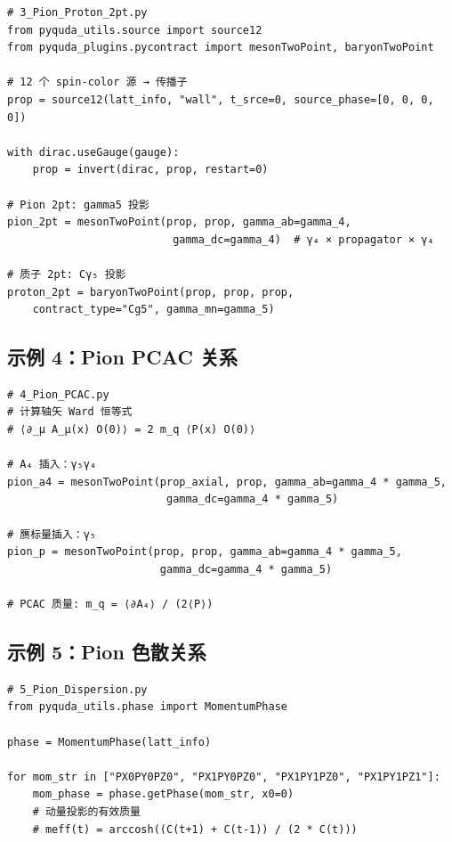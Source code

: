 \documentclass[12pt,a4paper]{ctexart}
\begin{document}
\begin{lstlisting}[style=pycode]
# 3_Pion_Proton_2pt.py
from pyquda_utils.source import source12
from pyquda_plugins.pycontract import mesonTwoPoint, baryonTwoPoint

# 12 个 spin-color 源 → 传播子
prop = source12(latt_info, "wall", t_srce=0, source_phase=[0, 0, 0, 0])

with dirac.useGauge(gauge):
    prop = invert(dirac, prop, restart=0)

# Pion 2pt: gamma5 投影
pion_2pt = mesonTwoPoint(prop, prop, gamma_ab=gamma_4,
                          gamma_dc=gamma_4)  # γ₄ × propagator × γ₄

# 质子 2pt: Cγ₅ 投影
proton_2pt = baryonTwoPoint(prop, prop, prop,
    contract_type="Cg5", gamma_mn=gamma_5)
\end{lstlisting}

\subsection{示例 4：Pion PCAC 关系}

\begin{lstlisting}[style=pycode]
# 4_Pion_PCAC.py
# 计算轴矢 Ward 恒等式
# ⟨∂_μ A_μ(x) O(0)⟩ = 2 m_q ⟨P(x) O(0)⟩

# A₄ 插入：γ₅γ₄
pion_a4 = mesonTwoPoint(prop_axial, prop, gamma_ab=gamma_4 * gamma_5,
                         gamma_dc=gamma_4 * gamma_5)

# 赝标量插入：γ₅
pion_p = mesonTwoPoint(prop, prop, gamma_ab=gamma_4 * gamma_5,
                        gamma_dc=gamma_4 * gamma_5)

# PCAC 质量: m_q = ⟨∂A₄⟩ / (2⟨P⟩)
\end{lstlisting}

\subsection{示例 5：Pion 色散关系}

\begin{lstlisting}[style=pycode]
# 5_Pion_Dispersion.py
from pyquda_utils.phase import MomentumPhase

phase = MomentumPhase(latt_info)

for mom_str in ["PX0PY0PZ0", "PX1PY0PZ0", "PX1PY1PZ0", "PX1PY1PZ1"]:
    mom_phase = phase.getPhase(mom_str, x0=0)
    # 动量投影的有效质量
    # meff(t) = arccosh((C(t+1) + C(t-1)) / (2 * C(t)))
\end{lstlisting}

\end{document}
